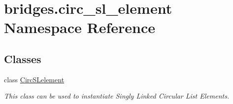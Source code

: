 \hypertarget{namespacebridges_1_1circ__sl__element}{}\section{bridges.\+circ\+\_\+sl\+\_\+element Namespace Reference}
\label{namespacebridges_1_1circ__sl__element}
\subsection*{Classes}
\begin{DoxyCompactItemize}
\item 
class \mbox{\hyperlink{classbridges_1_1circ__sl__element_1_1_circ_s_lelement}{Circ\+S\+Lelement}}
\begin{DoxyCompactList}\small\item\em This class can be used to instantiate Singly Linked Circular List Elements. \end{DoxyCompactList}\end{DoxyCompactItemize}
